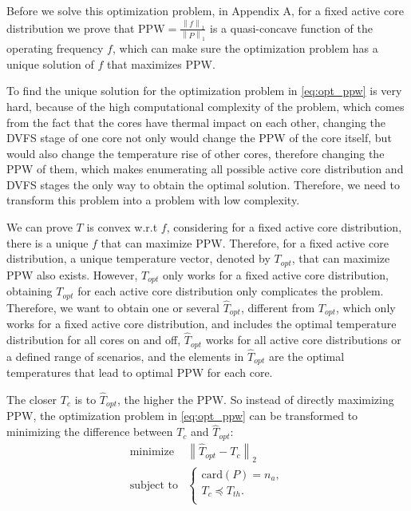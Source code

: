 Before we solve this optimization problem, in Appendix A, for a fixed active core distribution we prove that $\text{PPW}=\frac{\left \| f \right \|_{1}}{\left \| P \right \|_{1}}$ is a quasi-concave function of the operating frequency $f$, which can make sure the optimization problem has a unique solution of $f$ that maximizes PPW.

To find the unique solution for the optimization problem in \eqref{eq:opt_ppw} is very hard, because of the high computational complexity of the problem, which comes from the fact that the cores have thermal impact on each other, changing the DVFS stage of one core not only would change the PPW of the core itself, but would also change the temperature rise of other cores, therefore changing the PPW of them, which makes enumerating all possible active core distribution and DVFS stages the only way to obtain the optimal solution. Therefore, we need to transform this problem into a problem with low complexity.

We can prove $T$ is convex w.r.t $f$, considering for a fixed active core distribution, there is a unique $f$ that can maximize PPW. Therefore, for a fixed active core distribution, a unique temperature vector, denoted by $T_{opt}$, that can maximize PPW also exists. However, $T_{opt}$ only works for a fixed active core distribution, obtaining $T_{opt}$ for each active core distribution only complicates the problem. Therefore, we want to obtain one or several $\hat{T}_{opt}$, different from $T_{opt}$, which only works for a fixed active core distribution, and includes the optimal temperature distribution for all cores on and off, $\hat{T}_{opt}$ works for all active core distributions or a defined range of scenarios, and the elements in $\hat{T}_{opt}$ are the optimal temperatures that lead to optimal PPW for each core.


The closer $T_{c}$ is to $\hat{T}_{opt}$, the higher the PPW. So instead of
directly maximizing PPW, the optimization problem in \eqref{eq:opt_ppw} can be transformed to minimizing the difference between $T_{c}$ and $\hat{T}_{opt}$:
\begin{equation}\label{eq:ppw_minimize_t}
\begin{split}
\text{minimize } &  \left \| \hat{T}_{opt}-T_{c} \right \|_{2}\\
\text{subject to} &\left\{
\begin{array}{lr}
\text{card}(P) = n_{a},\\
T_{c} \preceq T_{th}.\\
\end{array}
\right.
\end{split}
\end{equation}


